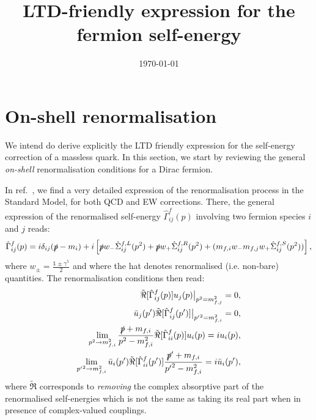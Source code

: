 \documentclass[11pt]{article}
\date{\today}
\begin{document}
\title{LTD-friendly expression for the fermion self-energy}
\maketitle

\section{On-shell renormalisation}
\label{OnShellRenormalisation}

We intend do derive explicitly the LTD friendly expression for the self-energy correction of a massless quark. In this section, we start by reviewing the general \emph{on-shell} renormalisation conditions for a Dirac fermion.

In ref.~\cite{Denner:1991kt}, we find a very detailed expression of the renormalisation process in the Standard Model, for both QCD and EW corrections.
There, the general expression of the renormalised self-energy $\hat{\Gamma}^{f}_{ij}(p)$ involving two fermion species $i$ and $j$ reads:
\begin{equation}
\label{RenormalisedFermionSelfEnergy}
\hat{\Gamma}^{f}_{ij}(p) = i \delta_{ij} (\slashed{p} - m_i) + i \left [ 
\slashed{p} w_- \hat{\Sigma}_{ij}^{f,L}(p^2) + \slashed{p} w_+ \hat{\Sigma}_{ij}^{f,R}(p^2) + (m_{f,i}w_- m_{f,j}w_+ \hat{\Sigma}_{ij}^{f,S}(p^2) ) \right ],
\end{equation}
where $w_\pm=\frac{\mathbb{1}\pm\gamma^5}{2}$ and where the hat denotes renormalised (i.e. non-bare) quantities.
The renormalisation conditions then read:
\begin{eqnarray}
\label{renormConditionsA}
\tilde{\Re}[\hat{\Gamma}^{f}_{ij}(p)]u_j(p) {\big |}_{p^2=m_{f,j}^2} = 0, \\
\label{renormConditionsB}
\bar{u}_j(p') \tilde{\Re}[\hat{\Gamma}^{f}_{ij}(p')] {\big |}_{{p'}^2=m_{f,i}^2} = 0, \\
\label{renormConditionsC}
\lim_{p^2\rightarrow m_{f,i}^2} \frac{\slashed{p}+m_{f,i}}{p^2-m_{f,i}^2} \tilde{\Re}[\hat{\Gamma}^{f}_{ii}(p)]u_i(p) = i u_i(p), \\
\label{renormConditionsD}
\lim_{{p'}^2\rightarrow m_{f,i}^2} \bar{u}_i(p') \tilde{\Re}[\hat{\Gamma}^{f}_{ii}(p')] \frac{\slashed{p}'+m_{f,i}}{{p'}^2-m_{f,i}^2} = i \bar{u}_i(p'),
\end{eqnarray}
where $\tilde{\Re}$ corresponds to \emph{removing} the complex absorptive part of the renormalised self-energies which is not the same as taking its real part when in presence of complex-valued couplings.
\end{document}
